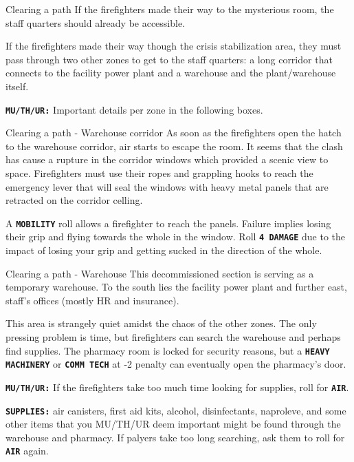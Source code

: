 \begin{rpg-commentbox}{Clearing a path}
    If the firefighters made their way to the mysterious room, the staff quarters should already be accessible. 

    If the firefighters made their way though the crisis stabilization area, they must pass through two other zones to get to the staff quarters: a long corridor that connects to the facility power plant and a warehouse and the plant/warehouse itself. 
    
    \texttt{\textbf{MU/TH/UR:}} Important details per zone in the following boxes.
\end{rpg-commentbox}



\begin{rpg-commentbox}{Clearing a path - Warehouse corridor}
    As soon as the firefighters open the hatch to the warehouse corridor, air starts to escape the room. It seems that the clash has cause a rupture in the corridor windows which provided a scenic view to space. Firefighters must use their ropes and grappling hooks to reach the emergency lever that will seal the windows with heavy metal panels that are retracted on the corridor celling.
    
    A \texttt{\textbf{MOBILITY}} roll allows a firefighter to reach the panels. Failure implies losing their grip and flying towards the whole in the window. Roll \texttt{\textbf{4 DAMAGE}} due to the impact of losing your grip and getting sucked in the direction of the whole. 
\end{rpg-commentbox}




\begin{rpg-commentbox}{Clearing a path - Warehouse}
    This decommissioned section is serving as a temporary warehouse. To the south lies the facility power plant and further east, staff's offices (mostly HR and insurance).
    
    This area is strangely quiet amidst the chaos of the other zones. The only pressing problem is time, but firefighters can search the warehouse and perhaps find supplies. The pharmacy room is locked for security reasons, but a \texttt{\textbf{HEAVY MACHINERY}} or \texttt{\textbf{COMM TECH}} at -2 penalty can eventually open the pharmacy's door.

    
    \texttt{\textbf{MU/TH/UR:}} If the firefighters take too much time looking for supplies, roll for \texttt{\textbf{AIR}}.

    
    
    \texttt{\textbf{SUPPLIES:}} air canisters, first aid kits, alcohol, disinfectants, naproleve, and some other items that you MU/TH/UR deem important might be found through the warehouse and pharmacy. If palyers take too long searching, ask them to roll for \texttt{\textbf{AIR}} again.
\end{rpg-commentbox}

